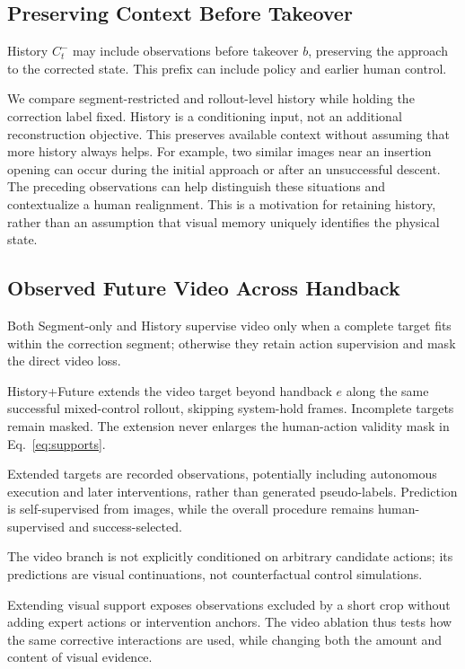 \documentclass[letterpaper,10pt,conference]{ieeeconf}
\begin{document}
\subsection{Preserving Context Before Takeover}
History $C_t^-$ may include observations before takeover $b$, preserving the approach to the corrected state. This prefix can include policy and earlier human control.

We compare segment-restricted and rollout-level history while holding the correction label fixed. History is a conditioning input, not an additional reconstruction objective. This preserves available context without assuming that more history always helps. For example, two similar images near an insertion opening can occur during the initial approach or after an unsuccessful descent. The preceding observations can help distinguish these situations and contextualize a human realignment. This is a motivation for retaining history, rather than an assumption that visual memory uniquely identifies the physical state.

\subsection{Observed Future Video Across Handback}
Both Segment-only and History supervise video only when a complete target fits within the correction segment; otherwise they retain action supervision and mask the direct video loss.

History+Future extends the video target beyond handback $e$ along the same successful mixed-control rollout, skipping system-hold frames. Incomplete targets remain masked. The extension never enlarges the human-action validity mask in Eq.~\ref{eq:supports}.

Extended targets are recorded observations, potentially including autonomous execution and later interventions, rather than generated pseudo-labels. Prediction is self-supervised from images, while the overall procedure remains human-supervised and success-selected.

The video branch is not explicitly conditioned on arbitrary candidate actions; its predictions are visual continuations, not counterfactual control simulations.

Extending visual support exposes observations excluded by a short crop without adding expert actions or intervention anchors. The video ablation thus tests how the same corrective interactions are used, while changing both the amount and content of visual evidence.
\end{document}
